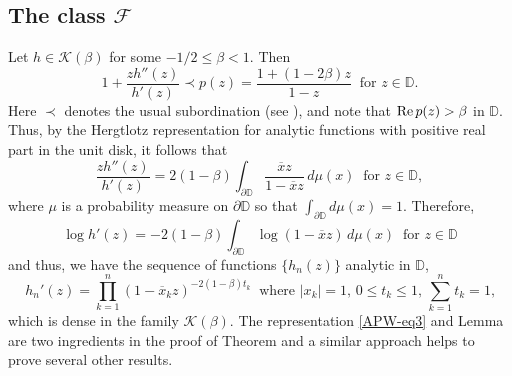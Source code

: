 \documentclass[a4paper,12pt]{amsart}
\theoremstyle{definition}
\newcounter{tmp}
\begin{document}
\subsection{The class $\mathcal{F}$}
Let $ h\in \mathcal{K}(\beta)$ for some $-1/2\leq \beta <1$. 
Then
$$1+\frac{zh''(z)}{h'(z)}\prec p(z)=\frac{1+(1-2\beta )z}{1-z} ~\mbox{ for $z\in {{\mathbb D}}$}.
$$
Here $\prec$ denotes the usual subordination (see \cite{Dur,Pomm}), and note that ${\rm Re}\,p(z)>\beta $ in ${{\mathbb D}}$.
Thus, by the Hergtlotz representation for analytic functions with positive real part in the unit disk, it
follows that
$$\frac{zh''(z)}{h' (z)} =2(1-\beta) \int_{\partial {{\mathbb D}}}\frac{\overline{x}z}{1-\overline{x}z }\,d\mu (x) ~\mbox{ for $z\in {{\mathbb D}}$},
$$
where $\mu $ is a probability measure on $\partial {{\mathbb D}}$ so that $\int_{\partial {{\mathbb D}}} d\mu (x)=1$.
Therefore,
$$\log h'(z)=-2(1-\beta) \int_{\partial {{\mathbb D}}} \log (1-\overline{x}z )\,d\mu (x) ~\mbox{ for $z\in {{\mathbb D}}$}
$$
and thus, we have the sequence of functions $\{h_n(z)\}$ analytic in ${{\mathbb D}}$,
\begin{equation}\label{APW-eq3}
h_n'(z)= \prod _{k=1}^n(1-\overline{x}_{k}z)^{-2(1-\beta)t_k} ~\mbox{ where $|x_k|=1$, $0\leq t _{k}\leq 1$, $\sum\limits_{k=1}^{n}t _{k}=1$,}
\end{equation}
which is dense in the family $ \mathcal{K}(\beta).$ The representation \eqref{APW-eq3} and Lemma {} are two ingredients in the proof of
Theorem {} and a similar approach helps to prove several other results.
\end{document}
